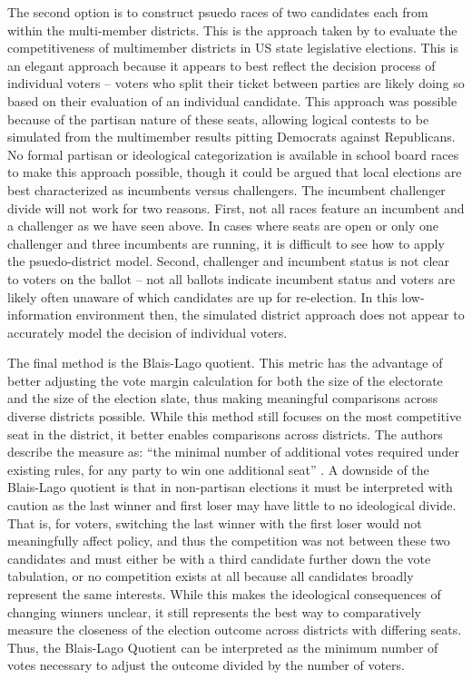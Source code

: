 The second option is to construct psuedo races of two candidates each from within 
the multi-member districts. This is the approach taken by \citet{jackmanwinsky} to 
evaluate the competitiveness of multimember districts in US state legislative elections. 
This is an elegant approach because it appears to best reflect 
the decision process of individual voters -- voters who split their ticket between 
parties are likely doing so based on their evaluation of an individual candidate.
This approach was possible because of the partisan nature of these seats, allowing 
logical contests to be simulated from the multimember results pitting Democrats 
against Republicans. No formal partisan or ideological categorization is 
available in school board races to make this approach possible, though it could 
be argued that local elections are best characterized as incumbents versus 
challengers. The incumbent challenger divide will not work for two reasons. First, 
not all races feature an incumbent and a challenger as we have seen above. In cases 
where seats are open or only one challenger and three incumbents are running, it is 
difficult to see how to apply the psuedo-district model. Second, challenger and 
incumbent status is not clear to voters on the ballot -- not all ballots indicate 
incumbent status and voters are likely often unaware of which candidates are up 
for re-election. In this low-information environment then, the simulated district 
approach does not appear to accurately model the decision of individual voters. 

The final method is the Blais-Lago quotient. This metric has the advantage of 
better adjusting the vote margin calculation for both the size of the electorate 
and the size of the election slate, thus making meaningful comparisons across 
diverse districts possible. While this method still focuses on the most competitive 
seat in the district, it better enables comparisons across districts. The authors 
describe the measure as: ``the minimal number of additional votes required under 
existing rules, for any party to win one additional seat'' \citep{blaislago}. 
A downside of the Blais-Lago quotient is that in non-partisan elections it must be interpreted with caution as the last 
winner and first loser may have little to no ideological divide. That is, for voters, 
switching the last winner with the first loser would not meaningfully affect policy, 
and thus the competition was not between these two candidates and must either be 
with a third candidate further down the vote tabulation, or no competition exists 
at all because all candidates broadly represent the same interests. While this 
makes the ideological consequences of changing winners unclear, it still represents 
the best way to comparatively measure the closeness of the election outcome across 
districts with differing seats. Thus, the Blais-Lago Quotient can be 
interpreted as the minimum number of votes necessary to adjust the outcome divided 
by the number of voters. 

